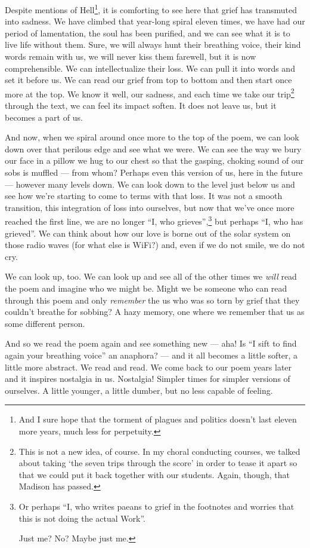 \documentclass[12pt,oneside]{memoir}
\begin{document}
Despite mentions of Hell\footnote{And I sure hope that the torment of plagues and politics doesn't last eleven more years, much less for perpetuity.}, it is comforting to see here that grief has transmuted into sadness. We have climbed that year-long spiral eleven times, we have had our period of lamentation, the soul has been purified, and we can see what it is to live life without them. Sure, we will always hunt their breathing voice, their kind words remain with us, we will never kiss them farewell, but it is now comprehensible. We can intellectualize their loss. We can pull it into words and set it before us. We can read our grief from top to bottom and then start once more at the top. We know it well, our sadness, and each time we take our trip\footnote{This is not a new idea, of course. In my choral conducting courses, we talked about taking `the seven trips through the score' in order to tease it apart so that we could put it back together with our students. Again, though, that Madison has passed.} through the text, we can feel its impact soften. It does not leave us, but it becomes  a part of us.

And now, when we spiral around once more to the top of the poem, we can look down over that perilous edge and see what we were. We can see the way we bury our face in a pillow we hug to our chest so that the gasping, choking sound of our sobs is muffled --- from whom? Perhaps even this version of us, here in the future --- however many levels down. We can look down to the level just below us and see how we're starting to come to terms with that loss. It was not a smooth transition, this integration of loss into ourselves, but now that we've once more reached the first line, we are no longer ``I, who grieves'',\footnote{Or perhaps ``I, who writes paeans to grief in the footnotes and worries that this is not doing the actual Work''.\par Just me? No? Maybe just me.} but perhaps ``I, who has grieved''. We can think about how our love is borne out of the solar system on those radio waves (for what else is WiFi?) and, even if we do not smile, we do not cry.

We can look up, too. We can look up and see all of the other times we \emph{will} read the poem and imagine who we might be. Might we be someone who can read through this poem and only \emph{remember} the us who was so torn by grief that they couldn't breathe for sobbing? A hazy memory, one where we remember that us as some different person.

And so we read the poem again and see something new --- aha! Is ``I sift to find again your breathing voice'' an anaphora? --- and it all becomes a little softer, a little more abstract. We read and read. We come back to our poem years later and it inspires nostalgia in us. Nostalgia! Simpler times for simpler versions of ourselves. A little younger, a little dumber, but no less capable of feeling.
\end{document}
